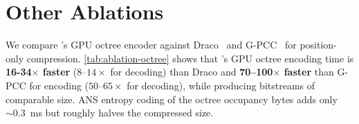 \section{Other Ablations}\label{app:other-ablations}

\begin{table}[t]
  \centering
  \footnotesize
  \caption{Position-only octree encoding on point-cloud sequences. Encode/decode in ms, size in KB, averaged per frame.}
  \label{tab:ptcl-octree}
\end{table}
%

%
We compare \gsnfs{}'s GPU octree encoder against Draco~\cite{draco} and G-PCC~\cite{gpcc} for position-only compression.
%
%
\cref{tab:ablation-octree} shows that \gsnfs{}'s GPU octree encoding time is \textbf{16-34$\boldsymbol\times$ faster} ($8$--$14\times$ for decoding) than Draco and \textbf{70--100$\boldsymbol\times$ faster} than G-PCC for encoding ($50$--$65\times$ for decoding), while producing bitstreams of comparable size.
%
ANS entropy coding of the octree occupancy bytes adds only ${\sim}0.3$~ms but roughly halves the compressed size.

